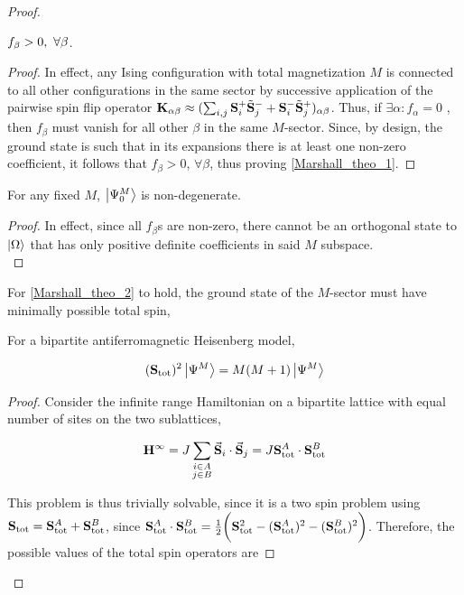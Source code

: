 \documentclass{homework}
\begin{document}
\begin{proof}
\begin{lemma}
   $f_{\beta} > 0, \textnormal{ } \forall \beta$.
\end{lemma}

\begin{proof}
In effect, any Ising configuration with total magnetization $M$ is connected to all other configurations in the same sector by successive application of the pairwise spin flip operator ${\bf K}_{\alpha \beta} \approx (\sum_{i,j} {\bf S}_i^+ \tilde{{\bf S}}_j^- + {\bf S}_i^- \tilde{{\bf S}}_j^+)_{\alpha \beta}$. Thus, if $\exists \alpha: f_{\alpha} = 0$ , then $f_{\beta}$ must vanish for all other $\beta$ in the same $M$-sector. Since, by design, the ground state is such that in its expansions there is at least one non-zero coefficient, it follows that $f_{\beta} > 0$, $\forall{\beta}$, thus proving \cref{Marshall_theo_1}.
\end{proof}

\begin{corr}
For any fixed $M$, $\ket{\Psi^M_0}$ is non-degenerate.
\label{HH_non_degeneracy}
\end{corr}

\begin{proof}
In effect, since all $f_{\beta}$s are non-zero, there cannot be an orthogonal state to $\ket{\Omega}$ that has only positive definite coefficients in said $M$ subspace. \\
\end{proof}

For \cref{Marshall_theo_2} to hold, the ground state of the $M$-sector must have minimally possible total spin, 

\begin{lemma}
   For a bipartite antiferromagnetic Heisenberg model, 
   
   $$
   ({\bf S}_{\textnormal{tot}})^2 \ket{\Psi^M} = M(M+1)\ket{\Psi^M}
   $$
\end{lemma}

\begin{proof}
Consider the infinite range Hamiltonian on a bipartite lattice with equal number of sites on the two sublattices, 

$$
    {\bf H}^{\infty} = J \sum_{\substack{
    i \in A \\
    j \in B}} \vec{{\bf S}}_i \cdot \vec{{\bf S}}_j = J {\bf S}_{\textnormal{tot}}^A \cdot {\bf S}_{\textnormal{tot}}^B
$$

This problem is thus trivially solvable, since it is a two spin problem using ${\bf S}_{\textnormal{tot}} = {\bf S}_{\textnormal{tot}}^A + {\bf S}_{\textnormal{tot}}^B$, since ${\bf S}_{\textnormal{tot}}^A \cdot {\bf S}_{\textnormal{tot}}^B = \frac{1}{2} \bigg( {\bf S}_{\textnormal{tot}}^2 - ({\bf S}_{\textnormal{tot}}^A)^2 - ({\bf S}_{\textnormal{tot}}^B)^2 \bigg)$.
Therefore, the possible values of the total spin operators are 


\end{proof}
\end{proof}
\end{document}
